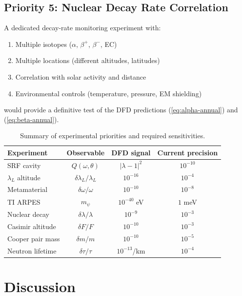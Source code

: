 \documentclass[aps,prb,twocolumn,superscriptaddress,floatfix,nofootinbib,longbibliography]{revtex4-2}
\begin{document}
\subsection{Priority 5: Nuclear Decay Rate Correlation}

A dedicated decay-rate monitoring experiment with:
\begin{enumerate}[nosep]
\item Multiple isotopes ($\alpha$, $\beta^+$, $\beta^-$, EC)
\item Multiple locations (different altitudes, latitudes)
\item Correlation with solar activity and distance
\item Environmental controls (temperature, pressure, EM shielding)
\end{enumerate}
would provide a definitive test of the DFD predictions
(\ref{eq:alpha-annual}) and (\ref{eq:beta-annual}).

\begin{table}[h]
\caption{Summary of experimental priorities and required sensitivities.}
\label{tab:experiments}
\begin{ruledtabular}
\begin{tabular}{lccc}
Experiment & Observable & DFD signal & Current precision \\
\hline
SRF cavity & $Q(\omega,\theta)$ & $|\lambda-1|^2$ & $10^{-10}$ \\
$\lambda_L$ altitude & $\delta\lambda_L/\lambda_L$ & $10^{-16}$ & $10^{-4}$ \\
Metamaterial & $\delta\omega/\omega$ & $10^{-10}$ & $10^{-8}$ \\
TI ARPES & $m_\psi$ & $10^{-40}$ eV & $1$ meV \\
Nuclear decay & $\delta\lambda/\lambda$ & $10^{-9}$ & $10^{-3}$ \\
Casimir altitude & $\delta F/F$ & $10^{-10}$ & $10^{-3}$ \\
Cooper pair mass & $\delta m/m$ & $10^{-10}$ & $10^{-5}$ \\
Neutron lifetime & $\delta\tau/\tau$ & $10^{-13}$/km & $10^{-4}$ \\
\end{tabular}
\end{ruledtabular}
\end{table}

\section{Discussion}\label{sec:discussion}
\end{document}
